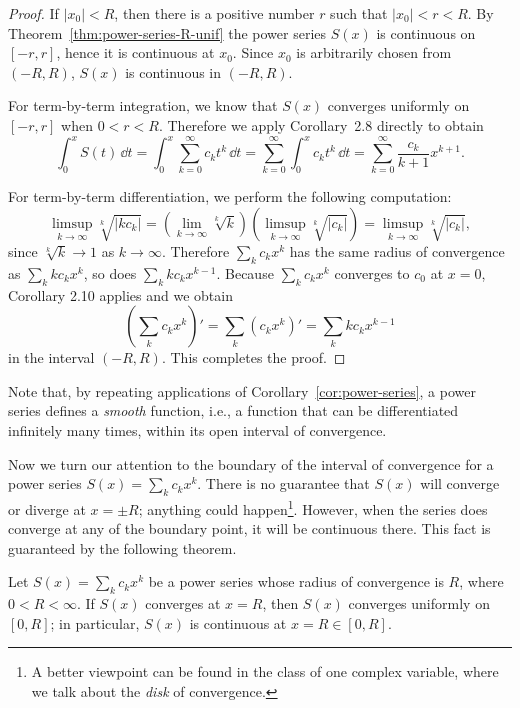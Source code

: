 \documentclass[11pt]{article}
\begin{document}
\begin{proof}
  If $|x_0| < R$, then there is a positive number $r$ such that $|x_0| < r < R$.
  By Theorem~\ref{thm:power-series-R-unif} the power series $S(x)$ is continuous on $[-r,r]$, hence it is continuous at $x_0$.
  Since $x_0$ is arbitrarily chosen from $(-R, R)$, $S(x)$ is continuous in $(-R, R)$.

  For term-by-term integration, we know that $S(x)$ converges uniformly on $[-r,r]$ when $0 < r < R$.  Therefore we apply Corollary~2.8 directly to obtain
  \[
    \int_0^x S(t) \, \dd t = \int_0^x \sum_{k=0}^\infty c_k t^k \, \dd t = \sum_{k=0}^\infty \int_0^x c_k t^k \, \dd t = \sum_{k=0}^\infty \frac{c_k}{k+1} x^{k+1}.
  \]

  For term-by-term differentiation, we perform the following computation:
  \[
    \limsup_{k \to \infty} \sqrt[k]{|k c_k|} = \left( \lim_{k \to \infty} \sqrt[k]{k} \right) \left( \limsup_{k \to \infty} \sqrt[k]{|c_k|} \right) = \limsup_{k \to \infty} \sqrt[k]{|c_k|},
  \]
  since $\sqrt[k]{k} \to 1$ as $k \to \infty$.
  Therefore $\sum_k c_k x^k$ has the same radius of convergence as $\sum_k k c_k x^k$, so does $\sum_k k c_k x^{k-1}$.
  Because $\sum_k c_k x^k$ converges to $c_0$ at $x = 0$, Corollary 2.10 applies and we obtain
  \[
    \left( \sum_k c_k x^k \right)' = \sum_k (c_k x^k)' = \sum_k k c_k x^{k-1}
  \]
  in the interval $(-R, R)$.
  This completes the proof.
\end{proof}

Note that, by repeating applications of Corollary~\ref{cor:power-series}, a power series defines a \textit{smooth} function, i.e., a function that can be differentiated infinitely many times, within its open interval of convergence.

Now we turn our attention to the boundary of the interval of convergence for a power series $S(x) = \sum_k c_k x^k$.
There is no guarantee that $S(x)$ will converge or diverge at $x = \pm R$; anything could happen\footnote{A better viewpoint can be found in the class of one complex variable, where we talk about the \textit{disk} of convergence.}.
However, when the series does converge at any of the boundary point, it will be continuous there.  This fact is guaranteed by the following theorem.

\begin{thm}
  \label{thm:abel}
  Let $S(x) = \sum_k c_k x^k$ be a power series whose radius of convergence is $R$, where $0 < R < \infty$.
  If $S(x)$ converges at $x = R$, then $S(x)$ converges uniformly on $[0,R]$; in particular, $S(x)$ is continuous at $x = R \in [0, R]$.
\end{thm}
\end{document}
